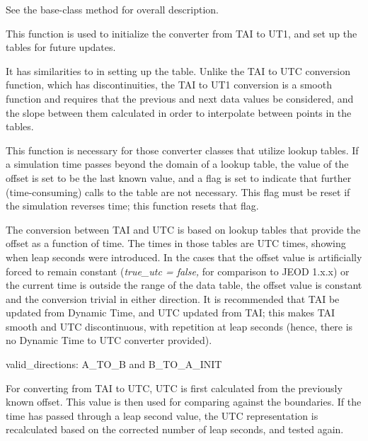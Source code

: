 {\begin{enumerate}
{\begin{enumerate}
See the base-class  method 
for overall description.




This function is used to initialize the converter from TAI to UT1, and
set up the tables for future updates.

It has similarities to 
 in
setting up the table.  Unlike the TAI to UTC conversion function, which
has discontinuities, the TAI to UT1 conversion is a smooth function and
requires that the previous and next data values be considered, and the
slope between them calculated in order to interpolate between points in
the tables.

This function is necessary for those converter classes that utilize
lookup tables.  If a simulation time passes beyond the domain of a
lookup table, the value of the offset is set to be the last known
value, and a flag is set to indicate that further (time-consuming)
calls to the table are not necessary.  This flag must be reset if the
simulation reverses time; this function resets that flag.

\end{enumerate}}

\label{ref:TimeConverterTAIUTC}

The conversion between TAI and UTC is based on lookup
tables that provide the offset as a function of time.  The times in
those tables are UTC times, showing when leap seconds were
introduced.  In the cases that the offset value is artificially forced
to remain constant (\textit{true\_utc = false,} for comparison to
JEOD 1.x.x) or the current time is outside the range of the data table,
the offset value is constant and the conversion trivial in either
direction.  It is recommended that TAI be updated from
 Dynamic Time, and UTC updated from TAI; this makes
TAI smooth and UTC discontinuous, with repetition at
leap seconds (hence, there is no Dynamic Time to UTC converter
provided).

{\begin{enumerate}
valid\_directions:
A\_TO\_B and B\_TO\_A\_INIT

For converting from TAI to UTC, UTC is first calculated from the
previously known offset.  This value is then used for comparing against
the boundaries.  If the time has passed through a leap second value,
the UTC representation is recalculated based on the corrected number of
leap seconds, and tested again.


\end{enumerate}}
\end{enumerate}}
